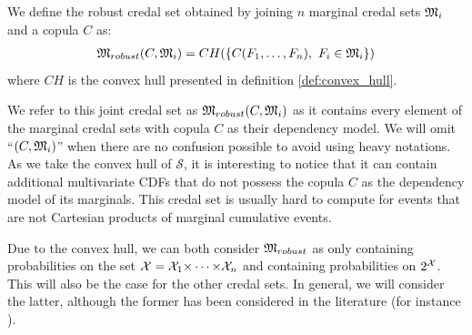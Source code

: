 \begin{definition}\label{def:robust_credal_set}
    We define the robust credal set obtained by joining $n$ marginal credal sets ${\mathfrak{M}}_i$ and a copula $C$ as:
    \begin{eqnarray}\label{eq:robust_set}
        {\mathfrak{M}}_{robust}(C,{\mathfrak{M}}_i) = CH(\{C(F_1, \dots, F_n),~F_i\in{\mathfrak{M}}_i \})
    \end{eqnarray}
    where $CH$ is the convex hull presented in definition \ref{def:convex_hull}.
\end{definition}

We refer to this joint credal set as ${\mathfrak{M}}_{robust}(C,{\mathfrak{M}}_i)$ as it contains every element of the marginal credal sets with copula $C$ as their dependency model. We will omit ``$(C,{\mathfrak{M}}_i)$'' when there are no confusion possible to avoid using heavy notations. As we take the convex hull of $\mathcal{S}$, it is interesting to notice that it can contain additional multivariate CDFs that do not possess the copula $C$ as the dependency model of its marginals. This credal set is usually hard to compute for events that are not Cartesian products of marginal cumulative events.

\begin{remark}
    Due to the convex hull, we can both consider ${\mathfrak{M}}_{robust}$ as only containing probabilities on the set ${\mathcal{X}}={\mathcal{X}}_1{\times\dots\times}{\mathcal{X}}_n$ and containing probabilities on $2^{\mathcal{X}}$. This will also be the case for the other credal sets. In general, we will consider the latter, although the former has been considered in the literature (for instance \cite{schmelzer_characterizing_2012, schmelzer_random_2023}).
\end{remark}

